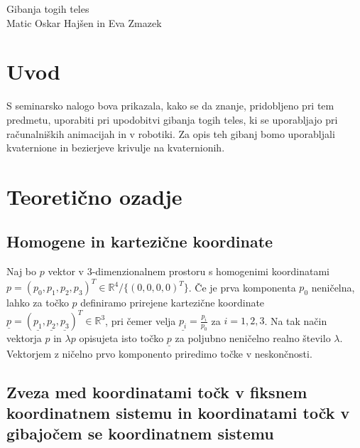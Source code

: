 \documentclass[12pt,a4paper,twoside]{article}
\theoremstyle{definition} %
\theoremstyle{plain} %
\numberwithin{equation}{section}  %
\newcommand{\R}{\mathbb R}
\begin{document}
\thispagestyle{empty} %



\begin{titlepage}\centering
{}
\vspace*{\fill}
{\LARGE Gibanja togih teles} \\[1cm]
\large Matic Oskar Hajšen  in  Eva Zmazek
\vspace*{\fill}
\vfill
{}
\end{titlepage}

\cleardoublepage

\tableofcontents

\lstlistoflistings

\newpage

\section{Uvod}

S seminarsko nalogo bova prikazala, kako se da znanje, pridobljeno pri tem predmetu, uporabiti pri upodobitvi gibanja togih teles, ki se uporabljajo pri računalniških animacijah in v robotiki. Za opis teh gibanj bomo uporabljali kvaternione in bezierjeve krivulje na kvaternionih.

\section{Teoretično ozadje}

\subsection{Homogene in kartezične koordinate}

Naj bo $p$ vektor v $3$-dimenzionalnem prostoru s homogenimi koordinatami $p = (p_0,p_1,p_2,p_3)^T \in \R^4 / \{(0,0,0,0)^T\}$. Če je prva komponenta $p_0$ neničelna, lahko za točko $p$ definiramo prirejene kartezične koordinate $\underline{p} = (\underline{p_1}, \underline{p_2}, \underline{p_3})^T \in \R^3$, pri čemer velja $\underline{p_i} = \frac{p_i}{p_0}$ za $i=1,2,3$. Na tak način vektorja $p$ in $\lambda p$ opisujeta isto točko $\underline{p}$ za poljubno neničelno realno število $\lambda$. Vektorjem z ničelno prvo komponento priredimo točke v neskončnosti.

\subsection{Zveza med koordinatami točk v fiksnem koordinatnem sistemu in koordinatami točk v gibajočem se koordinatnem sistemu}
\end{document}
